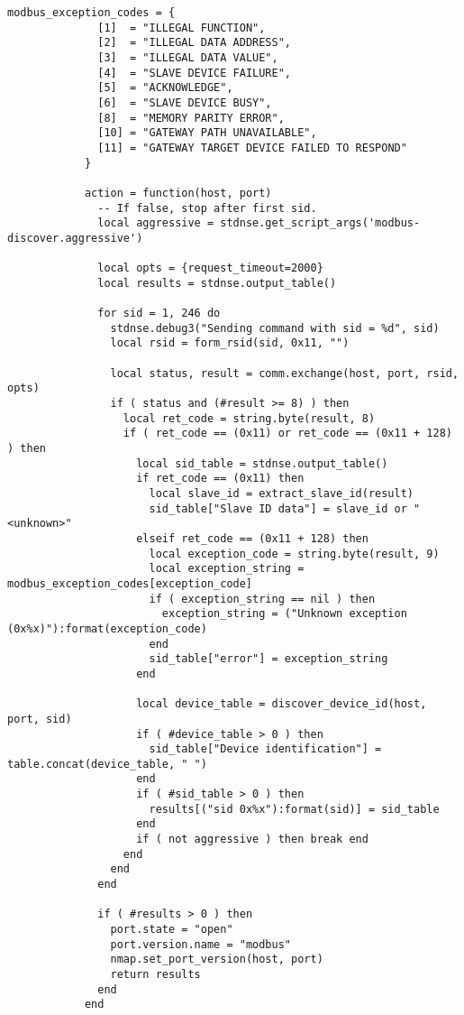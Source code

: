 \documentclass[article,msc=informatik,type=msc,colorback,accentcolor=tud9c]{tudthesis}
\begin{document}
\begin{appendix}
\begin{lstlisting}[caption= Nmap Modbus Discovery Script, label=lst:Nmap Modbus Discovery Script]
  	      	modbus_exception_codes = {
  	      	  [1]  = "ILLEGAL FUNCTION",
  	      	  [2]  = "ILLEGAL DATA ADDRESS",
  	      	  [3]  = "ILLEGAL DATA VALUE",
  	      	  [4]  = "SLAVE DEVICE FAILURE",
  	      	  [5]  = "ACKNOWLEDGE",
  	      	  [6]  = "SLAVE DEVICE BUSY",
  	      	  [8]  = "MEMORY PARITY ERROR",
  	      	  [10] = "GATEWAY PATH UNAVAILABLE",
  	      	  [11] = "GATEWAY TARGET DEVICE FAILED TO RESPOND"
  	      	}
  	      	
  	      	action = function(host, port)
  	      	  -- If false, stop after first sid.
  	      	  local aggressive = stdnse.get_script_args('modbus-discover.aggressive')
  	      	
  	      	  local opts = {request_timeout=2000}
  	      	  local results = stdnse.output_table()
  	      	
  	      	  for sid = 1, 246 do
  	      	    stdnse.debug3("Sending command with sid = %d", sid)
  	      	    local rsid = form_rsid(sid, 0x11, "")
  	      	
  	      	    local status, result = comm.exchange(host, port, rsid, opts)
  	      	    if ( status and (#result >= 8) ) then
  	      	      local ret_code = string.byte(result, 8)
  	      	      if ( ret_code == (0x11) or ret_code == (0x11 + 128) ) then
  	      	        local sid_table = stdnse.output_table()
  	      	        if ret_code == (0x11) then
  	      	          local slave_id = extract_slave_id(result)
  	      	          sid_table["Slave ID data"] = slave_id or "<unknown>"
  	      	        elseif ret_code == (0x11 + 128) then
  	      	          local exception_code = string.byte(result, 9)
  	      	          local exception_string = modbus_exception_codes[exception_code]
  	      	          if ( exception_string == nil ) then
  	      	            exception_string = ("Unknown exception (0x%x)"):format(exception_code)
  	      	          end
  	      	          sid_table["error"] = exception_string
  	      	        end
  	      	
  	      	        local device_table = discover_device_id(host, port, sid)
  	      	        if ( #device_table > 0 ) then
  	      	          sid_table["Device identification"] = table.concat(device_table, " ")
  	      	        end
  	      	        if ( #sid_table > 0 ) then
  	      	          results[("sid 0x%x"):format(sid)] = sid_table
  	      	        end
  	      	        if ( not aggressive ) then break end
  	      	      end
  	      	    end
  	      	  end
  	      	
  	      	  if ( #results > 0 ) then
  	      	    port.state = "open"
  	      	    port.version.name = "modbus"
  	      	    nmap.set_port_version(host, port)
  	      	    return results
  	      	  end
  	      	end
  	      	

\end{lstlisting}
\end{appendix}
\end{document}
